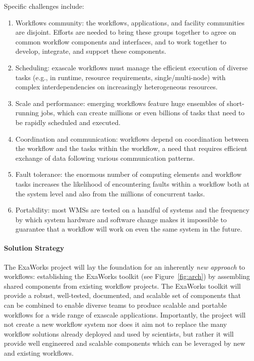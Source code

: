 Specific challenges include: 
\begin{enumerate}
    \item Workflows community: the workflows, applications, and facility communities are disjoint. Efforts are needed to bring these groups together to agree on common workflow components and interfaces, and to work together to develop, integrate, and support these components.
    \item Scheduling: exascale workflows must manage the efficient execution of diverse
    tasks (e.g., in runtime, resource requirements, single/multi-node) with complex interdependencies on increasingly heterogeneous resources. 
    \item Scale and performance: emerging workflows feature huge ensembles of short-running jobs, which can create millions or even billions of tasks that need to be rapidly scheduled and executed.
    \item Coordination and communication: workflows depend on coordination between the workflow and the tasks within the workflow, a need that requires efficient exchange of data following various communication patterns.
    \item Fault tolerance: the enormous number of computing elements and workflow tasks increases the likelihood of encountering faults within a workflow both at the system level and also from the millions of concurrent tasks. 
    \item Portability: most WMSs are tested on a handful of systems and the frequency by which system hardware and software change makes it impossible to guarantee that a workflow will work on even the same system in the future.
\end{enumerate}

\paragraph{Solution Strategy}
The ExaWorks project will lay the foundation for an inherently
\textit{new approach} to workflows: establishing the ExaWorks toolkit (see
Figure~\ref{fig:arch}) by assembling shared components from existing workflow
projects. The ExaWorks toolkit will provide a robust, well-tested, documented,
and scalable set of components that can be combined to enable diverse teams to
produce scalable and portable workflows for a wide range of exascale
applications. Importantly, the project will not create a new workflow system
nor does it aim not to replace the many workflow solutions already deployed
and used by scientists, but rather it will provide well engineered and
scalable components which can be leveraged by new and existing workflows.


